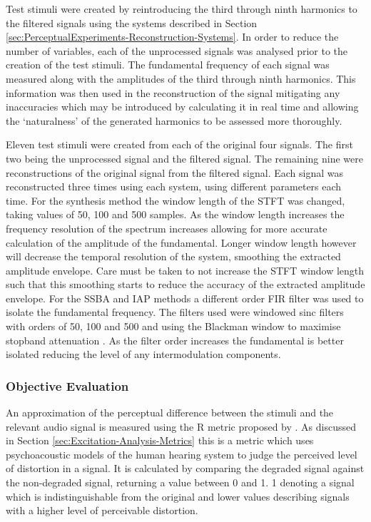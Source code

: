			Test stimuli were created by reintroducing the third through ninth harmonics to the filtered
			signals using the systems described in Section
			\ref{sec:PerceptualExperiments-Reconstruction-Systems}. In order to reduce the number of variables,
			each of the unprocessed signals was analysed prior to the creation of the test stimuli. The
			fundamental frequency of each signal was measured along with the amplitudes of the third through
			ninth harmonics. This information was then used in the reconstruction of the signal mitigating any
			inaccuracies which may be introduced by calculating it in real time and allowing the `naturalness'
			of the generated harmonics to be assessed more thoroughly.

			Eleven test stimuli were created from each of the original four signals. The first two being the
			unprocessed signal and the filtered signal. The remaining nine were reconstructions of the original
			signal from the filtered signal. Each signal was reconstructed three times using each system, using
			different parameters each time. For the synthesis method the window length of the STFT was changed,
			taking values of 50, 100 and 500 samples. As the window length increases the frequency resolution
			of the spectrum increases allowing for more accurate calculation of the amplitude of the
			fundamental.  Longer window length however will decrease the temporal resolution of the system,
			smoothing the extracted amplitude envelope. Care must be taken to not increase the STFT window
			length such that this smoothing starts to reduce the accuracy of the extracted amplitude envelope.
			For the SSBA and IAP methods a different order FIR filter was used to isolate the fundamental
			frequency. The filters used were windowed sinc filters with orders of 50, 100 and 500 and using the
			Blackman window to maximise stopband attenuation \citep{schlichtharle2011digital}. As the filter
			order increases the fundamental is better isolated reducing the level of any intermodulation
			components.

		\subsubsection*{Objective Evaluation}
			An approximation of the perceptual difference between the stimuli and the relevant audio signal is
			measured using the R metric proposed by \citet{tan2004predicting}. As discussed in
			Section \ref{sec:Excitation-Analysis-Metrics} this is a metric which uses psychoacoustic models of
			the human hearing system to judge the perceived level of distortion in a signal. It is calculated
			by comparing the degraded signal against the non-degraded signal, returning a value between 0 and
			1. 1 denoting a signal which is indistinguishable from the original and lower values describing
			signals with a higher level of perceivable distortion.

